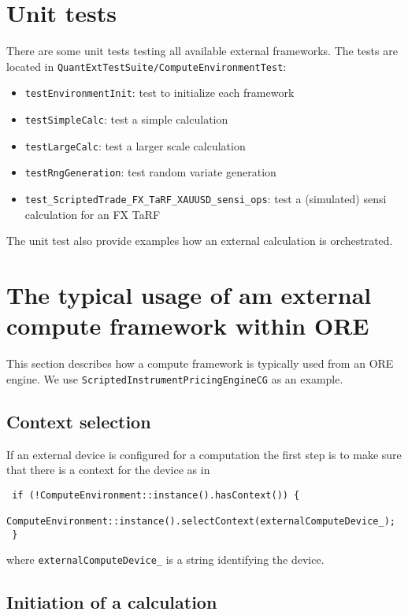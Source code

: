 \documentclass[12pt, a4paper]{article}
\begin{document}
\section{Unit tests}\label{unitTests}

There are some unit tests testing all available external frameworks. The tests are located in
\verb+QuantExtTestSuite/ComputeEnvironmentTest+:

\begin{itemize}
  \item \verb+testEnvironmentInit+: test to initialize each framework
  \item \verb+testSimpleCalc+: test a simple calculation
  \item \verb+testLargeCalc+: test a larger scale calculation
  \item \verb+testRngGeneration+: test random variate generation
  \item \verb+test_ScriptedTrade_FX_TaRF_XAUUSD_sensi_ops+: test a (simulated) sensi calculation for an FX TaRF
\end{itemize}

The unit test also provide examples how an external calculation is orchestrated.

\section{The typical usage of am external compute framework within ORE}\label{usageFromORE}

This section describes how a compute framework is typically used from an ORE engine. We use
\verb+ScriptedInstrumentPricingEngineCG+ as an example.


\subsection{Context selection}

If an external device is configured for a computation the first step is to make sure that there is a context for the
device as in

\begin{verbatim}
 if (!ComputeEnvironment::instance().hasContext()) {
     ComputeEnvironment::instance().selectContext(externalComputeDevice_);
 }
\end{verbatim}

where \verb+externalComputeDevice_+ is a string identifying the device.

\subsection{Initiation of a calculation}
\end{document}

